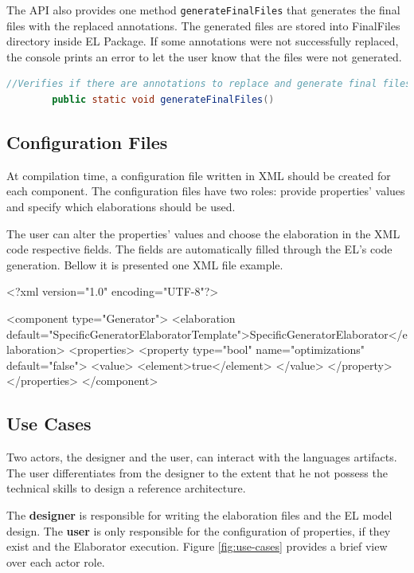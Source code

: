 \documentclass[11pt]{report}
\begin{document}
		\par The API also provides one method \texttt{generateFinalFiles} that generates the final files with the replaced annotations. The generated files are stored into FinalFiles directory inside EL Package. If some annotations were not successfully replaced, the console prints an error to let the user know that the files were not generated.
		
		\begin{lstlisting}[language=Java]
		//Verifies if there are annotations to replace and generate final files
		public static void generateFinalFiles()
		\end{lstlisting}		
		
		\subsection{Configuration Files}
		
		\par At compilation time, a configuration file written in XML should be created for each component. The configuration files have two roles: provide properties' values and specify which elaborations should be used.
		\par The user can alter the properties' values and choose the elaboration in the XML code respective fields. The fields are automatically filled through the EL's code generation. Bellow it is presented one XML file example.
		
		\begin{EL}
		<?xml version="1.0" encoding="UTF-8"?>
		
		<component type="Generator">
			<elaboration default="SpecificGeneratorElaboratorTemplate">SpecificGeneratorElaborator</elaboration>
			<properties>
				<property type="bool" name="optimizations" default="false"> 
					<value>
						<element>true</element>
					</value>
				</property>
			</properties>
		</component>
		\end{EL}
		
		\subsection{Use Cases}
		
		\par Two actors, the designer and the user, can interact with the languages artifacts. The user differentiates
		from the designer to the extent that he not possess the technical skills to design a reference architecture.
		\par The \textbf{designer} is responsible for writing the elaboration files and the EL model design. The \textbf{user} is only responsible for the configuration of properties, if they exist and the Elaborator execution. Figure \ref{fig:use-cases} provides a brief view over each actor role.
		
\end{document}
